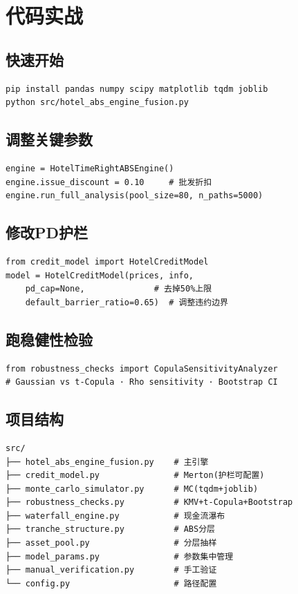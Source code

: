 \documentclass[12pt,a4paper]{ctexart}
\begin{document}
\newpage

\section{代码实战}

\subsection{快速开始}
\begin{verbatim}
pip install pandas numpy scipy matplotlib tqdm joblib
python src/hotel_abs_engine_fusion.py
\end{verbatim}

\subsection{调整关键参数}
\begin{verbatim}
engine = HotelTimeRightABSEngine()
engine.issue_discount = 0.10     # 批发折扣
engine.run_full_analysis(pool_size=80, n_paths=5000)
\end{verbatim}

\subsection{修改PD护栏}
\begin{verbatim}
from credit_model import HotelCreditModel
model = HotelCreditModel(prices, info,
    pd_cap=None,              # 去掉50%上限
    default_barrier_ratio=0.65)  # 调整违约边界
\end{verbatim}

\subsection{跑稳健性检验}
\begin{verbatim}
from robustness_checks import CopulaSensitivityAnalyzer
# Gaussian vs t-Copula · Rho sensitivity · Bootstrap CI
\end{verbatim}

\subsection{项目结构}
\begin{verbatim}
src/
├── hotel_abs_engine_fusion.py    # 主引擎
├── credit_model.py               # Merton(护栏可配置)
├── monte_carlo_simulator.py      # MC(tqdm+joblib)
├── robustness_checks.py          # KMV+t-Copula+Bootstrap
├── waterfall_engine.py           # 现金流瀑布
├── tranche_structure.py          # ABS分层
├── asset_pool.py                 # 分层抽样
├── model_params.py               # 参数集中管理
├── manual_verification.py        # 手工验证
└── config.py                     # 路径配置
\end{verbatim}
\end{document}
